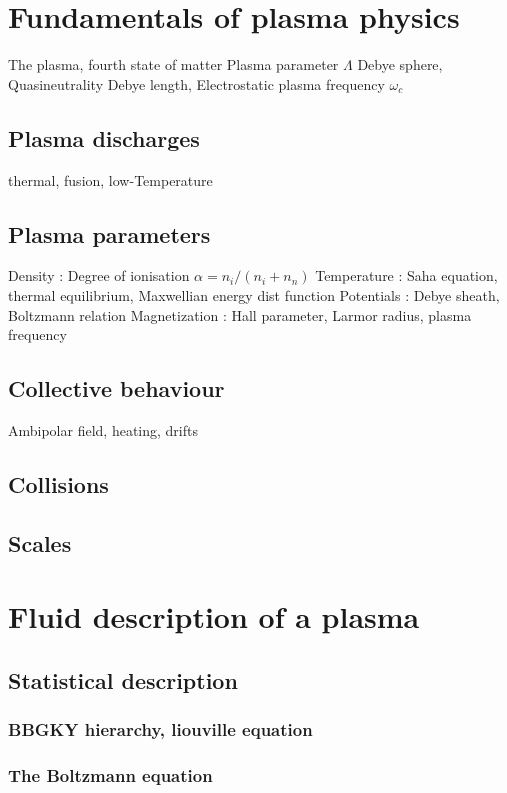 	\section{Fundamentals of plasma physics}
	The plasma, fourth state of matter
		Plasma parameter $\Lambda$ Debye sphere, Quasineutrality Debye length, Electrostatic plasma frequency $\omega_c$
		\subsection{Plasma discharges}
			thermal, fusion, low-Temperature
		\subsection{Plasma parameters}
			Density : Degree of ionisation $\alpha=n_i/(n_i+n_n)$
			Temperature : Saha equation, thermal equilibrium, Maxwellian energy dist function
			Potentials : Debye sheath, Boltzmann relation
			Magnetization : Hall parameter, Larmor radius, plasma frequency
		\subsection{Collective behaviour}
			Ambipolar field, heating, drifts
		\subsection{Collisions}
		\subsection{Scales}
		
	\section{Fluid description of a plasma}
		\subsection{Statistical description}
			\subsubsection{BBGKY hierarchy, liouville equation}
			\subsubsection{The Boltzmann equation}
